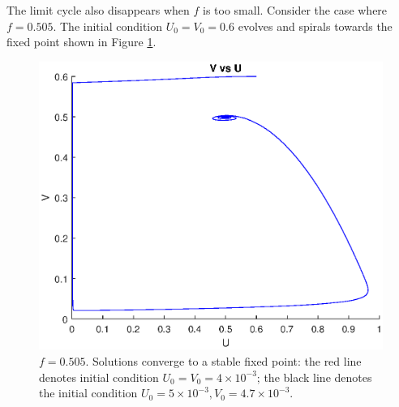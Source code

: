 \documentclass[twocolumn,amsmath,amssymb,aps]{revtex4}
\begin{document}
The limit cycle also disappears when $f$ is too small. Consider the case where $f = 0.505$. The initial condition $U_0 = V_0 = 0.6$ evolves and spirals towards the fixed point shown in Figure \ref{fig:hopf2}.
\begin{figure}[!htb]
	\centering
	\includegraphics[scale=0.5]{hopf2.eps}
	\caption{$f = 0.505$. Solutions converge to a stable fixed point: the red line denotes initial condition $U_0 =V_0 = 4\times 10^{-3}$; the black line denotes the initial condition $U_0 = 5\times 10^{-3}, V_0 = 4.7 \times 10^{-3}$.}
	\label{fig:hopf2}
\end{figure}
\end{document}
